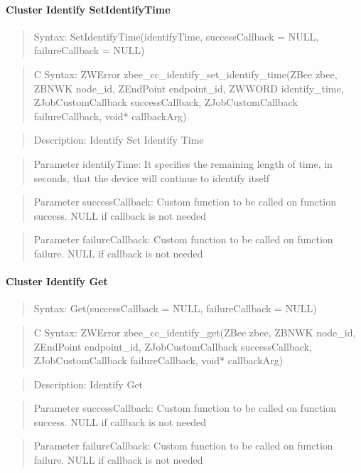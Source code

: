 \paragraph{Cluster Identify SetIdentifyTime}
\begin{quote}Syntax: SetIdentifyTime(identifyTime, successCallback = NULL, failureCallback = NULL)\end{quote}
\begin{quote}C Syntax: ZWError zbee\_cc\_identify\_set\_identify\_time(ZBee zbee, ZBNWK node\_id, ZEndPoint endpoint\_id, ZWWORD identify\_time, ZJobCustomCallback successCallback, ZJobCustomCallback failureCallback, void* callbackArg)\end{quote}
\begin{quote}Description: Identify Set Identify Time\end{quote}
\begin{quote}Parameter identifyTime: It specifies the remaining length of time, in seconds, that the device will continue to identify itself\end{quote}
\begin{quote}Parameter successCallback: Custom function to be called on function success. NULL if callback is not needed\end{quote}
\begin{quote}Parameter failureCallback: Custom function to be called on function failure. NULL if callback is not needed\end{quote}


\paragraph{Cluster Identify Get}
\begin{quote}Syntax: Get(successCallback = NULL, failureCallback = NULL)\end{quote}
\begin{quote}C Syntax: ZWError zbee\_cc\_identify\_get(ZBee zbee, ZBNWK node\_id, ZEndPoint endpoint\_id, ZJobCustomCallback successCallback, ZJobCustomCallback failureCallback, void* callbackArg)\end{quote}
\begin{quote}Description: Identify Get\end{quote}
\begin{quote}Parameter successCallback: Custom function to be called on function success. NULL if callback is not needed\end{quote}
\begin{quote}Parameter failureCallback: Custom function to be called on function failure. NULL if callback is not needed\end{quote}



